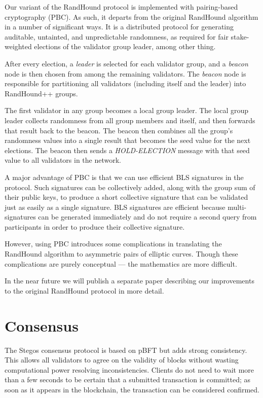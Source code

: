 \documentclass[a4paper, 10pt, conference]{ieeeconf}
\begin{document}
Our variant of the RandHound protocol is implemented with pairing-based cryptography (PBC). As such, it departs from the original RandHound algorithm in a number of significant ways. It is a distributed protocol for generating audit\-able, untainted, and unpredictable randomness, as required for fair stake-weighted elections of the validator group leader, among other thing.

After every election, a \textit{leader} is selected for each validator group, and a \textit{beacon} node is then chosen from among the remaining validators. The \textit{beacon} node is responsible for partitioning all validators (including itself and the leader) into RandHound++ groups. 

The first validator in any group becomes a {local group leader}. The local group leader collects randomness from all group members and itself, and then forwards that result back to the beacon. The beacon then combines all the group's randomness values into a single result that becomes the seed value for the next elections. The beacon then sends a \textit{HOLD-ELECTION} message with that seed value to all validators in the network.

A major advantage of PBC is that we can use efficient BLS signatures\cite{c16} in the protocol. Such signatures can be collectively added, along with the group sum of their public keys, to produce a short collective signature that can be validated just as easily as a single signature. BLS signatures are efficient because multi-signatures can be generated immediately and do not require a second query from participants in order to produce their collective signature.

However, using PBC introduces some complications in translating the RandHound algorithm to asymmetric pairs of elliptic curves. Though these complications are purely conceptual --- the mathematics are more difficult. 

In the near future we will publish a separate paper describing our improvements to the original RandHound protocol in more detail.

\section{Consensus}\label{consensus}

The Stegos consensus protocol is based on pBFT\cite{c9} but adds strong consistency. This allows all validators to agree on the validity of blocks without wasting computational power resolving inconsistencies. Clients do not need to wait more than a few seconds to be certain that a submitted transaction is committed; as soon as it appears in the blockchain, the transaction can be considered confirmed. 
\end{document}
